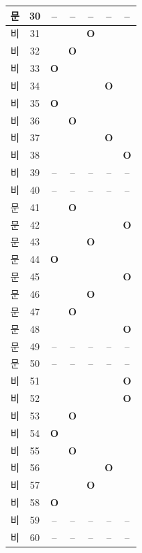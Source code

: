 \documentclass[11pt, a4paper]{article}
\begin{document}
\begin{tabularx}{\textwidth}{|c|c|c|c|c|c|c|}
\hline
[3]문 & 30 & -- & -- & -- & -- & -- \\
\hline
[4]비 & 31 &  &  & \textbf{O} &  &  \\
\hline
[4]비 & 32 &  & \textbf{O} &  &  &  \\
\hline
[4]비 & 33 & \textbf{O} &  &  &  &  \\
\hline
[4]비 & 34 &  &  &  & \textbf{O} &  \\
\hline
[4]비 & 35 & \textbf{O} &  &  &  &  \\
\hline
[4]비 & 36 &  & \textbf{O} &  &  &  \\
\hline
[4]비 & 37 &  &  &  & \textbf{O} &  \\
\hline
[4]비 & 38 &  &  &  &  & \textbf{O} \\
\hline
[4]비 & 39 & -- & -- & -- & -- & -- \\
\hline
[4]비 & 40 & -- & -- & -- & -- & -- \\
\hline
[5]문 & 41 &  & \textbf{O} &  &  &  \\
\hline
[5]문 & 42 &  &  &  &  & \textbf{O} \\
\hline
[5]문 & 43 &  &  & \textbf{O} &  &  \\
\hline
[5]문 & 44 & \textbf{O} &  &  &  &  \\
\hline
[5]문 & 45 &  &  &  &  & \textbf{O} \\
\hline
[5]문 & 46 &  &  & \textbf{O} &  &  \\
\hline
[5]문 & 47 &  & \textbf{O} &  &  &  \\
\hline
[5]문 & 48 &  &  &  &  & \textbf{O} \\
\hline
[5]문 & 49 & -- & -- & -- & -- & -- \\
\hline
[5]문 & 50 & -- & -- & -- & -- & -- \\
\hline
[6]비 & 51 &  &  &  &  & \textbf{O} \\
\hline
[6]비 & 52 &  &  &  &  & \textbf{O} \\
\hline
[6]비 & 53 &  & \textbf{O} &  &  &  \\
\hline
[6]비 & 54 & \textbf{O} &  &  &  &  \\
\hline
[6]비 & 55 &  & \textbf{O} &  &  &  \\
\hline
[6]비 & 56 &  &  &  & \textbf{O} &  \\
\hline
[6]비 & 57 &  &  & \textbf{O} &  &  \\
\hline
[6]비 & 58 & \textbf{O} &  &  &  &  \\
\hline
[6]비 & 59 & -- & -- & -- & -- & -- \\
\hline
[6]비 & 60 & -- & -- & -- & -- & -- \\
\hline
\end{tabularx}
\vspace{5mm}
\end{document}
